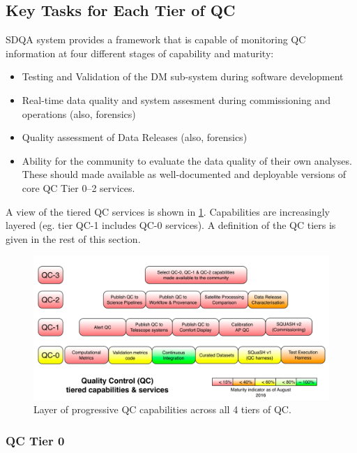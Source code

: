 \subsection{Key Tasks for Each Tier of QC}

SDQA system provides a framework that is capable of monitoring QC information at four different stages of capability and maturity:

\begin{itemize}
\item[QC Tier 0] Testing and Validation of the DM sub-system during software development
\item[QC Tier 1] Real-time data quality and system assesment during commissioning and operations (also, forensics)
\item[QC Tier 2] Quality assessment of Data Releases (also, forensics)
\item[QC Tier 3] Ability for the community to evaluate the data quality of their own analyses. These should made available as well-documented and deployable versions of core QC Tier 0--2 services.
\end{itemize}

A view of the tiered QC services is shown in \ref{fig:qa-overview}. Capabilities are increasingly layered (eg. tier QC-1 includes QC-0 services). A definition of the QC tiers is given in the rest of this section.

\begin{figure}
\centering
\includegraphics[width=\textwidth]{figures/qa_services.png}
\caption{Layer of progressive QC capabilities across all 4 tiers of QC.
\label{fig:qa-overview}}
\end{figure}



\subsubsection{QC Tier 0}

